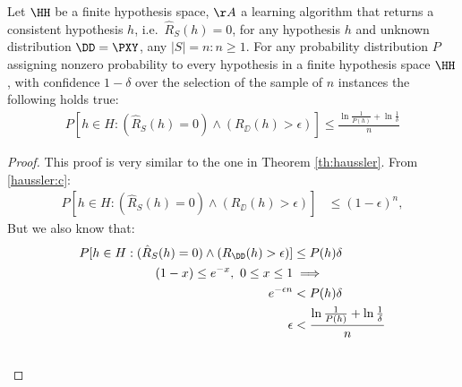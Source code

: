 \begin{theorem} Let \(\HH\) be a finite hypothesis space, \(\AA\) a learning algorithm that returns a consistent hypothesis \(h\), i.e.\ \(\hat{R}_{S}(h)=0\), for any hypothesis $h$ and unknown distribution \(\DD=\PXY\), any \(|S|=n: n \geq 1\). For any probability distribution $P$ assigning nonzero probability to every hypothesis in a finite hypothesis space \(\HH\), with confidence $1-\delta$ over the selection of the sample of $n$ instances the following holds true:\\
	\begin{align}
		P[h \in H: (\hat{R}_{S}(h)=0) \land (R_{\DD}(h)>\epsilon)]\leq \frac{\ln \frac{1}{P(h)}+ \ln \frac{1}{\delta}}{n}
	\end{align}
\end{theorem}
\begin{proof}
	This proof is very similar to the one in Theorem \ref{th:haussler}. From \eqref{haussler:c}:
	\begin{align}
		P[h \in H: (\hat{R}_{S}(h)=0) \land (R_{\DD}(h)>\epsilon)] &\leq (1-\epsilon)^n,
	\end{align}
	But we also know that:
	\begin{align}
		P[h \in H: (\hat{R}_{S}(h)=0) \land (R_{\DD}(h)>\epsilon)] &\leq P(h)\delta\\
		(1-x) \leq e^{-x},~0 \leq x \leq 1 &\implies \nonumber\\
		e^{-\epsilon n} &< P(h) \delta\\
		\epsilon &< \frac{\ln \frac{1}{P(h)}+ \ln \frac{1}{\delta}}{n} \\
		\nonumber \qedhere
	\end{align}
\end{proof}

